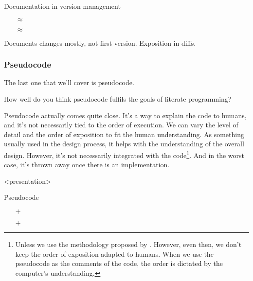 \begin{frame}
\begin{block}{Documentation in version management}
  \begin{itemize}
    \item[\(\approx\)] {\color{orange}\LPexplain}
    \item[\(\approx\)] {\color{orange}\LPorder}
  \end{itemize}
\end{block}

\begin{remark}
  Documents changes mostly, not first version.
  Exposition in diffs.
\end{remark}
\end{frame}

\subsubsection{Pseudocode}

The last one that we'll cover is pseudocode.

\begin{frame}
\begin{activity}
How well do you think pseudocode fulfils the goals of literate programming?
\end{activity}
\end{frame}

Pseudocode actually comes quite close.
It's a way to explain the code to humans, and it's not necessarily tied to the 
order of execution.
We can vary the level of detail and the order of exposition to fit the human 
understanding.
As something usually used in the design process, it helps with the 
understanding of the overall design.
However, it's not necessarily integrated with the code\footnote{%
  Unless we use the methodology proposed by \textcite[Ch.~9]{CodeComplete}.
  However, even then, we don't keep the order of exposition adapted to humans.
  When we use the pseudocode as the comments of the code, the order is dictated 
  by the computer's understanding.
}.
And in the worst case, it's thrown away once there is an implementation.

\begin{frame}<presentation>
\begin{block}{Pseudocode}
  \begin{itemize}
    \item[\(+\)] {\color{green!75!black}\LPexplain}
    \item[\(+\)] {\color{green!75!black}\LPorder}
  \end{itemize}
\end{block}
\end{frame}

